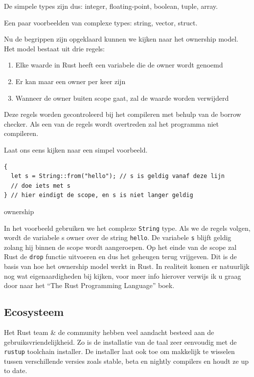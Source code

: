 De simpele types zijn dus: integer, floating-point, boolean, tuple, array.

Een paar voorbeelden van complexe types: string, vector, struct.

Nu de begrippen zijn opgeklaard kunnen we kijken naar het ownership model. Het model bestaat uit
drie regels: 
\begin{enumerate}
  \item Elke waarde in Rust heeft een variabele die de owner wordt genoemd 
  \item Er kan maar een owner per keer zijn 
  \item Wanneer de owner buiten scope gaat, zal de waarde worden verwijderd 
\end{enumerate}

Deze regels worden gecontroleerd bij het compileren met behulp van de borrow checker. Als een van de
regels wordt overtreden zal het programma niet compileren.  

Laat ons eens kijken naar een simpel voorbeeld.

\begin{listing}[h]
\begin{verbatim}
{
  let s = String::from("hello"); // s is geldig vanaf deze lijn
  // doe iets met s
} // hier eindigt de scope, en s is niet langer geldig
\end{verbatim}
\caption{ownership}
\end{listing}

In het voorbeeld gebruiken we het complexe \texttt{String} type. Als we de regels volgen,
wordt de variabele s owner over de string \texttt{hello}. De variabele
\texttt{s} blijft geldig zolang hij binnen de scope wordt aangeroepen. Op het einde van de
scope zal Rust de \texttt{drop} functie uitvoeren en dus het geheugen terug vrijgeven. Dit
is de basis van hoe het ownership model werkt in Rust. In realiteit komen er natuurlijk nog wat
eigenaardigheden bij kijken, voor meer info hierover verwijs ik u graag door naar het \enquote{The
Rust Programming Language} boek. \cite{rust_book}

\subsection{Ecosysteem}

Het Rust team \& de community hebben veel aandacht besteed aan de gebruiksvriendelijkheid. Zo is de
installatie van de taal zeer eenvoudig met de \texttt{rustup} toolchain installer. De
installer laat ook toe om makkelijk te wisselen tussen verschillende versies zoals stable, beta en
nightly compilers en houdt ze up to date.

